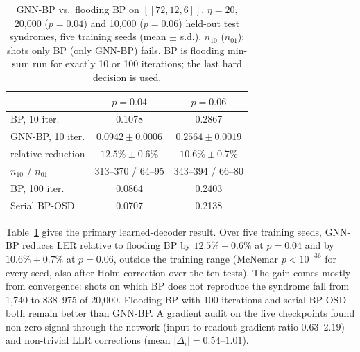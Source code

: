 \documentclass[a4paper,twocolumn,11pt,nopdfoutputerror]{quantumarticle}
\newcommand{\code}[3]{\ensuremath{[\![#1,#2,#3]\!]}}
\begin{document}
\begin{table}[t]
\centering
\caption{GNN-BP vs.\ flooding BP on $\code{72}{12}{6}$, $\eta=20$,
         20{,}000 ($p=0.04$) and 10{,}000 ($p=0.06$) held-out test
         syndromes, five training seeds (mean $\pm$ s.d.). $n_{10}$
         ($n_{01}$): shots only BP (only GNN-BP) fails. BP is flooding
         min-sum run for exactly 10 or 100 iterations; the last hard
         decision is used.}
\label{tab:gnn_flooding}
\footnotesize
\setlength{\tabcolsep}{3.5pt}
\begin{tabular}{@{}lcc@{}}
\toprule
 & $p=0.04$ & $p=0.06$ \\
\midrule
BP, 10 iter. & 0.1078 & 0.2867 \\
GNN-BP, 10 iter. & $0.0942\pm0.0006$ & $0.2564\pm0.0019$ \\
\quad relative reduction & $12.5\%\pm0.6\%$ & $10.6\%\pm0.7\%$ \\
\quad $n_{10}$ / $n_{01}$ & 313--370 / 64--95 & 343--394 / 66--80 \\
BP, 100 iter. & 0.0864 & 0.2403 \\
Serial BP-OSD & 0.0707 & 0.2138 \\
\bottomrule
\end{tabular}
\end{table}

Table~\ref{tab:gnn_flooding} gives the primary learned-decoder result.
Over five training seeds, GNN-BP reduces LER relative to flooding BP by
$12.5\%\pm0.6\%$ at $p=0.04$ and by $10.6\%\pm0.7\%$ at $p=0.06$, outside
the training range (McNemar $p<10^{-36}$ for every seed, also after Holm
correction over the ten tests). The gain comes
mostly from convergence: shots on which BP does not reproduce the
syndrome fall from 1{,}740 to 838--975 of 20{,}000. Flooding BP with 100
iterations and serial BP-OSD both remain better than GNN-BP. A gradient
audit on the five checkpoints found non-zero signal through the network
(input-to-readout gradient ratio $0.63$--$2.19$) and non-trivial LLR
corrections (mean $|\Delta_i|=0.54$--$1.01$).
\end{document}
